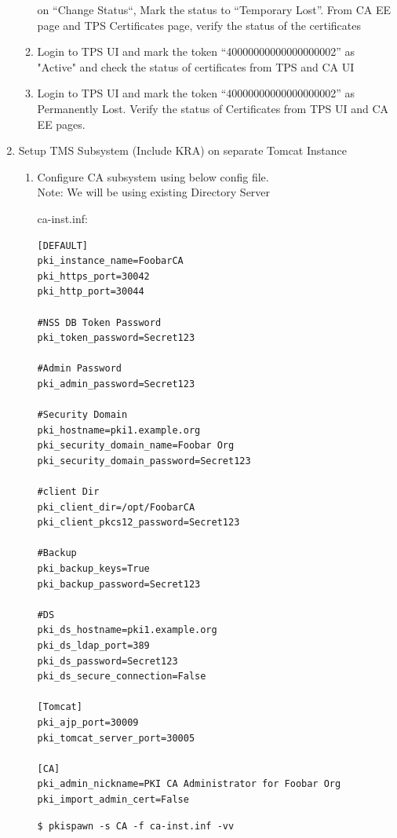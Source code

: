 \documentclass[a4paper]{article}
\begin{document}
\begin{enumerate}[label*=\arabic*.]
\begin{enumerate}[label*=\arabic*.]
                        on ``Change Status``, Mark the status to ``Temporary Lost''. From CA EE page and TPS Certificates
                        page, verify the status of the certificates
                    \item \label{token_ex13} Login to TPS UI and mark the token ``40000000000000000002'' as "Active" and check the status
                        of certificates from TPS and CA UI 
                    \item \label{token_ex14} Login to TPS UI and mark the token ``40000000000000000002'' as  Permanently Lost.  Verify the
                        status of Certificates from TPS UI and CA EE pages.
        \end{enumerate}
    \item Setup TMS Subsystem (Include KRA) on separate Tomcat Instance
        \begin{enumerate}[label*=\arabic*.]
            \item Configure CA subsystem using below config file.\\
                Note: We will be using existing Directory Server

                ca-inst.inf:
                \begin{lstlisting}[style=configFile]
[DEFAULT]
pki_instance_name=FoobarCA
pki_https_port=30042
pki_http_port=30044

#NSS DB Token Password
pki_token_password=Secret123

#Admin Password
pki_admin_password=Secret123

#Security Domain
pki_hostname=pki1.example.org
pki_security_domain_name=Foobar Org
pki_security_domain_password=Secret123

#client Dir
pki_client_dir=/opt/FoobarCA
pki_client_pkcs12_password=Secret123

#Backup
pki_backup_keys=True
pki_backup_password=Secret123

#DS
pki_ds_hostname=pki1.example.org
pki_ds_ldap_port=389
pki_ds_password=Secret123
pki_ds_secure_connection=False

[Tomcat]
pki_ajp_port=30009
pki_tomcat_server_port=30005

[CA]
pki_admin_nickname=PKI CA Administrator for Foobar Org
pki_import_admin_cert=False
                \end{lstlisting}
                \begin{lstlisting}
$ pkispawn -s CA -f ca-inst.inf -vv                
                \end{lstlisting}


\end{enumerate}
\end{enumerate}
\end{document}
